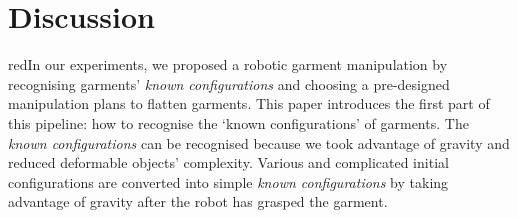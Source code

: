 \documentclass[conference]{IEEEtran}
\begin{document}


%

\section{Discussion \label{sec:discussion}}
{red}{In our experiments, we proposed a robotic garment manipulation by recognising garments’ \textit{known configurations} and choosing a pre-designed manipulation plans to flatten garments. This paper introduces the first part of this pipeline: how to recognise the ‘known configurations’ of garments.  The \textit{known configurations} can be recognised because we took advantage of gravity and reduced deformable objects' complexity. Various and complicated initial configurations are converted into simple \textit{known configurations} by taking advantage of gravity after the robot has grasped the garment.} 
\end{document}
